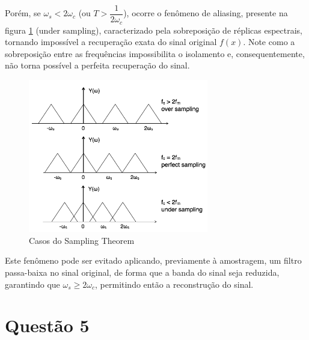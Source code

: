 \documentclass[]{abntex2}
\begin{document}
Porém, se \( \omega_s < 2\omega_c \) (ou \( T > \dfrac{1}{2\omega_c} \)), ocorre o fenômeno de aliasing, presente na figura \ref{fig:aliasing} (under sampling), caracterizado pela sobreposição de réplicas espectrais, tornando impossível a recuperação exata do sinal original \( f(x) \). Note como a sobreposição entre as frequências impossibilita o isolamento e, consequentemente, não torna possível a perfeita recuperação do sinal. 

\begin{figure}[H]
	\centering
	\includegraphics[width=0.7\textwidth]{./perfect_sampling.png}
	\caption{Casos do Sampling Theorem}
	\label{fig:aliasing}
\end{figure}

Este fenômeno pode ser evitado aplicando, previamente à amostragem, um filtro passa-baixa no sinal original, de forma que a banda do sinal seja reduzida, garantindo que \( \omega_s \geq 2\omega_c \), permitindo então a reconstrução do sinal.


\section*{\textbf{Questão 5}}
\end{document}
